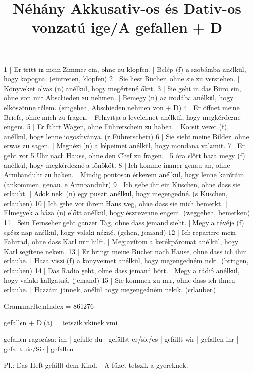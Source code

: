 \begin{exmp}
1 | Er tritt in mein Zimmer ein, ohne zu klopfen. | Belép (f) a szobámba anélkül, hogy kopogna. (eintreten, klopfen)
2 | Sie liest Bücher, ohne sie zu verstehen. | Könyveket olvas (n) anélkül, hogy megértené őket.
3 | Sie geht in das Büro ein, ohne von mir Abschieden zu nehmen. | Bemegy (n) az irodába anélkül, hogy elköszönne tőlem. (eingehen, Abschieden nehmen von + D)
4 | Er öffnet meine Briefe, ohne mich zu fragen. | Felnyitja a leveleimet anélkül, hogy megkérdezne engem.
5 | Er fährt Wagen, ohne Führerschein zu haben. | Kocsit vezet (f), anélkül, hogy lenne jogosítványa. (r Führerschein)
6 | Sie sieht meine Bilder, ohne etwas zu sagen. | Megnézi (n) a képeimet anélkül, hogy mondana valamit.
7 | Er geht vor 5 Uhr nach Hause, ohne den Chef zu fragen. | 5 óra előtt haza megy (f) anélkül, hogy megkérdezné a főnököt.
8 | Ich komme immer genau an, ohne Armbanduhr zu haben. | Mindig pontosan érkezem anélkül, hogy lenne karórám. (ankommen, genau, e Armbanduhr)
9 | Ich gebe ihr ein Küschen, ohne dass sie erlaubt. | Adok neki (n) egy puszit anélkül, hogy megengedné. (s Küschen, erlauben)
10 | Ich gehe vor ihrem Haus weg, ohne dass sie mich bemerkt. | Elmegyek a háza (n) előtt anélkül, hogy észrevenne engem. (weggehen, bemerken)
11 | Sein Fernseher geht ganzer Tag, ohne dass jemand sieht. | Megy a tévéje (f) egész nap anélkül, hogy valaki nézné. (gehen, jemand)
12 | Ich repariere mein Fahrrad, ohne dass Karl mir hilft. | Megjavítom a kerékpáromat anélkül, hogy Karl segítene nekem.
13 | Er bringt meine Bücher nach Hause, ohne dass ich ihm erlaube. | Haza viszi (f) a könyveimet anélkül, hogy megengedném neki. (bringen, erlauben)
14 | Das Radio geht, ohne dass jemand hört. | Megy a rádió anélkül, hogy valaki hallgatná. (jemand)
15 | Sie kommen zu mir, ohne dass ich ihnen erlaube. | Hozzám jönnek, anélül hogy megengedném nekik. (erlauben)
\end{exmp}

\title{Néhány Akkusativ-os és Dativ-os vonzatú ige/A gefallen + D}

GrammarItemIndex = 861276

\begin{desc}
gefallen + D (ä) = tetszik vkinek vmi

gefallen ragozása:
ich       | gefalle
du        | gefällst
er/sie/es | gefällt
wir       | gefallen
ihr       | gefallt
sie/Sie   | gefallen

Pl.: Das Heft gefällt dem Kind. - A füzet tetszik a gyereknek.
\end{desc}

